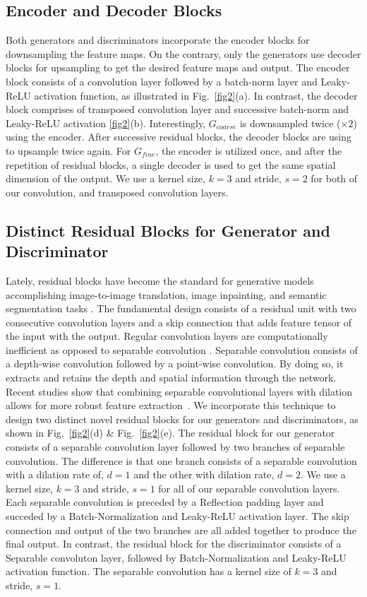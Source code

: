 \documentclass[a4paper,conference]{IEEEtran}
\begin{document}
\subsection{Encoder and Decoder Blocks}
\label{subsec:encdec}
Both generators and discriminators incorporate the encoder blocks for downsampling the feature maps. On the contrary, only the generators use decoder blocks for upsampling to get the desired feature maps and output. The encoder block consists of a convolution layer followed by a batch-norm layer \cite{ioffe2015batch} and Leaky-ReLU activation function, as illustrated in Fig.~\ref{fig2}(a). In contrast, the decoder block comprises of transposed convolution layer and successive batch-norm \cite{ioffe2015batch} and Leaky-ReLU activation \ref{fig2}(b).  Interestingly, $G_{coarse}$ is downsampled twice ($\times 2$) using the encoder. After successive residual blocks, the decoder blocks are using to upsample twice again. For $G_{fine}$, the encoder is utilized once, and after the repetition of residual blocks, a single decoder is used to get the same spatial dimension of the output. We use a kernel size, $k=3$ and stride, $s=2$ for both of our convolution, and transposed convolution layers. 

\subsection{Distinct Residual Blocks for Generator and Discriminator}
\label{subsec:residualblock}
Lately, residual blocks have become the standard for generative models accomplishing image-to-image translation, image inpainting, and semantic segmentation tasks \cite{wang2018high,park2019semantic}. The fundamental design consists of a residual unit with two consecutive convolution layers and a skip connection that adds feature tensor of the input with the output. Regular convolution layers are computationally inefficient as opposed to separable convolution \cite{chollet2017xception}. Separable convolution consists of a depth-wise convolution followed by a point-wise convolution. By doing so, it extracts and retains the depth and spatial information through the network. Recent studies show that combining separable convolutional layers with dilation allows for more robust feature extraction~\cite{opticnet19}. We incorporate this technique to design two distinct novel residual blocks for our generators and discriminators, as shown in Fig.~\ref{fig2}(d) \& Fig.~\ref{fig2}(e). The residual block for our generator consists of a separable convolution layer followed by two branches of separable convolution. The difference is that one branch consists of a separable convolution with a dilation rate of, $d=1$ and the other with dilation rate, $d=2$. We use a kernel size, $k=3$ and stride, $s=1$ for all of our separable convolution layers. Each separable convolution is preceded by a Reflection padding layer and succeded by a Batch-Normalization and Leaky-ReLU activation layer. The skip connection and output of the two branches are all added together to produce the final output. In contrast, the residual block for the discriminator consists of a Separable convoluton layer, followed by Batch-Normalization and Leaky-ReLU activation function. The separable convolution has a kernel size of $k=3$ and stride, $s=1$.
\end{document}
